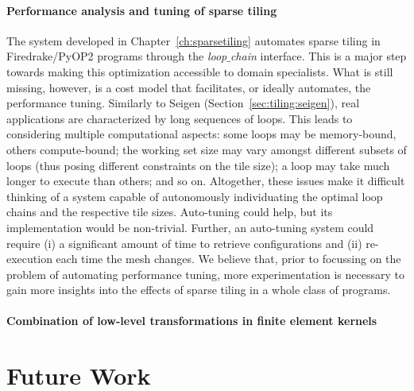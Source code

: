 \paragraph{Performance analysis and tuning of sparse tiling}
The system developed in Chapter~\ref{ch:sparsetiling} automates sparse tiling in Firedrake/PyOP2 programs through the {\em loop$\_$chain} interface. This is a major step towards making this optimization accessible to domain specialists. What is still missing, however, is a cost model that facilitates, or ideally automates, the performance tuning. Similarly to Seigen (Section~\ref{sec:tiling:seigen}), real applications are characterized by long sequences of loops. This leads to considering multiple computational aspects: some loops may be memory-bound, others compute-bound; the working set size may vary amongst different subsets of loops (thus posing different constraints on the tile size); a loop may take much longer to execute than others; and so on. Altogether, these issues make it difficult thinking of a system capable of autonomously individuating the optimal loop chains and the respective tile sizes. Auto-tuning could help, but its implementation would be non-trivial. Further, an auto-tuning system could require (i) a significant amount of time to retrieve configurations and (ii) re-execution each time the mesh changes. We believe that, prior to focussing on the problem of automating performance tuning, more experimentation is necessary to gain more insights into the effects of sparse tiling in a whole class of programs.


\paragraph{Combination of low-level transformations in finite element kernels}

\section{Future Work}
%
%
